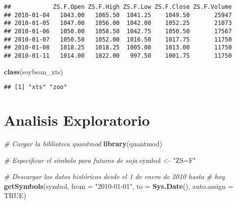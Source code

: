 \documentclass[
]{book}
\newenvironment{Shaded}{\begin{snugshade}}{\end{snugshade}}
\newcommand{\AttributeTok}[1]{\textcolor[rgb]{0.13,0.29,0.53}{#1}}
\newcommand{\CommentTok}[1]{\textcolor[rgb]{0.56,0.35,0.01}{\textit{#1}}}
\newcommand{\ConstantTok}[1]{\textcolor[rgb]{0.56,0.35,0.01}{#1}}
\newcommand{\DecValTok}[1]{\textcolor[rgb]{0.00,0.00,0.81}{#1}}
\newcommand{\FunctionTok}[1]{\textcolor[rgb]{0.13,0.29,0.53}{\textbf{#1}}}
\newcommand{\NormalTok}[1]{#1}
\newcommand{\OtherTok}[1]{\textcolor[rgb]{0.56,0.35,0.01}{#1}}
\newcommand{\SpecialCharTok}[1]{\textcolor[rgb]{0.81,0.36,0.00}{\textbf{#1}}}
\newcommand{\StringTok}[1]{\textcolor[rgb]{0.31,0.60,0.02}{#1}}
\begin{document}
\begin{Shaded}
\end{Shaded}

\begin{verbatim}
##            ZS.F.Open ZS.F.High ZS.F.Low ZS.F.Close ZS.F.Volume
## 2010-01-04   1043.00   1065.50  1041.25    1049.50       25947
## 2010-01-05   1047.00   1056.00  1042.00    1052.25       21073
## 2010-01-06   1050.00   1058.50  1042.75    1050.50       17567
## 2010-01-07   1050.50   1052.00  1016.50    1017.75       11750
## 2010-01-08   1018.25   1018.25  1005.00    1013.00       11750
## 2010-01-11   1014.00   1022.00   997.50    1001.75       11750
\end{verbatim}

\begin{Shaded}
\begin{Highlighting}[]
\FunctionTok{class}\NormalTok{(soybean\_xts)}
\end{Highlighting}
\end{Shaded}

\begin{verbatim}
## [1] "xts" "zoo"
\end{verbatim}

\hypertarget{analisis-exploratorio}{%
\chapter{Analisis Exploratorio}\label{analisis-exploratorio}}

\begin{Shaded}
\begin{Highlighting}[]
\CommentTok{\# Cargar la biblioteca quantmod}
\FunctionTok{library}\NormalTok{(quantmod)}

\CommentTok{\# Especificar el símbolo para futuros de soja}
\NormalTok{symbol }\OtherTok{\textless{}{-}} \StringTok{"ZS=F"}

\CommentTok{\# Descargar los datos históricos desde el 1 de enero de 2010 hasta}
\CommentTok{\# hoy}
\FunctionTok{getSymbols}\NormalTok{(symbol, }\AttributeTok{from =} \StringTok{"2010{-}01{-}01"}\NormalTok{, }\AttributeTok{to =} \FunctionTok{Sys.Date}\NormalTok{(), }
\AttributeTok{auto.assign =} \ConstantTok{TRUE}\NormalTok{)}
\end{Highlighting}
\end{Shaded}
\end{document}
